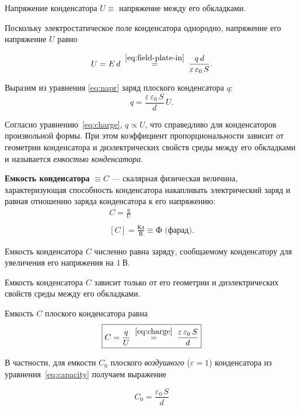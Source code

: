\documentclass[14pt,a4paper,oneside]{extreport}
\theoremstyle{definition}
\newcommand{\opr}[3]{%
  \refstepcounter{definition}%
  \begin{DefinitionBox}
    \textbf{#1} $\equiv #2$ — #3
  \end{DefinitionBox}
}
\newcommand{\zm}[1]{%
  \begin{RemarkBox}
    #1
  \end{RemarkBox}
}
\newcounter{definition}[chapter]
\begin{document}
\zm{Напряжение конденсатора $U \equiv$ напряжение между его обкладками. }

Поскольку электростатическое поле конденсатора однородно, напряжение его напряжение $U$ равно

\begin{equation}
U = E\,d \;\overset{\eqref{eq:field-plate-in}}{=}\;\frac{q\,d}{\varepsilon\,\varepsilon_0\,S}.
\label{eq:napr}
\end{equation}

Выразим из уравнения \ref{eq:napr} заряд плоского конденсатора $q$:
\begin{equation}
  q=\frac{\varepsilon\,\varepsilon_0\,S}{d}\,U.
  \label{eq:charge}
\end{equation} 

Согласно уравнению~\eqref{eq:charge}, $q \propto U$,
что справедливо для конденсаторов произвольной формы. При этом коэффициент
пропорциональности зависит от геометрии конденсатора и диэлектрических
свойств среды между его обкладками и называется
\textit{емкостью конденсатора}.
\opr{Емкость конденсатора}{C}{скалярная физическая величина, характеризующая способность конденсатора накапливать
электрический заряд и равная отношению заряда конденсатора к его
  напряжению:
\[
\begin{gathered}
  \boxed{C=\frac{q}{U}}\\
  \\
  [C]=\frac{\text{Кл}}{\text{В}}\equiv \text{Ф (фарад)}.
\end{gathered}
\]
} 

\zm{Емкость конденсатора $C$ численно равна заряду, сообщаемому конденсатору
для увеличения его напряжения на $1\ \text{В}$.}

\zm{Емкость конденсатора $C$ зависит только от его геометрии и диэлектрических свойств среды между его обкладками.}

Емкость $C$ плоского конденсатора равна
\begin{equation}
\boxed{
C=\frac{q}{U}
\;\overset{\eqref{eq:charge}}{=}\;
\frac{\varepsilon\,\varepsilon_0\,S}{d}
}
\label{eq:capacity}
\end{equation}

В частности, для емкости $C_0$ плоского \textit{воздушного} ($\varepsilon=1$) конденсатора
из уравнения~\eqref{eq:capacity} получаем выражение

\begin{equation}
\boxed{
C_0=\frac{\varepsilon_0\,S}{d}
}
\end{equation}
\end{document}

